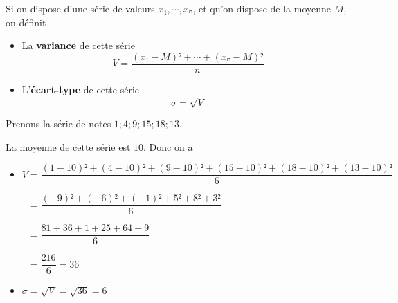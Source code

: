 \documentclass[
	classe=$2^{de}$
]{coursclass}
\begin{document}
\begin{definition}
	Si on dispose d'une série de valeurs $x₁, ⋯, xₙ$, et qu'on dispose de la moyenne $M$, on définit
	\begin{itemize}
		\item La \textbf{variance} de cette série
		      $$ V = \dfrac{(x₁ - M)² + ⋯ + (xₙ - M)²}{n} $$
		\item L'\textbf{écart-type} de cette série
		      $$ σ = \sqrt{V} $$
	\end{itemize}
\end{definition}

\begin{exemple}
	Prenons la série de notes $1 ; 4 ; 9 ; 15 ; 18 ; 13$.

	La moyenne de cette série est $10$. Donc on a
	\begin{itemize}
		\item $V = \dfrac{(1 - 10)² + (4 - 10)² + (9 - 10)² + (15 - 10)² + (18 - 10)² + (13 - 10)²}{6}$ \vspace{0.5em}

		      $\phantom{V} = \dfrac{(-9)² + (-6)² + (-1)² + 5² + 8² + 3²}{6}$ \vspace{0.5em}

		      $\phantom{V} = \dfrac{81 + 36 + 1 + 25 + 64 + 9}{6}$ \vspace{0.5em}

		      $\phantom{V} = \dfrac{216}{6} = 36$
		\item $σ = \sqrt{V} = \sqrt{36} = 6$
	\end{itemize}
\end{exemple}
\end{document}
